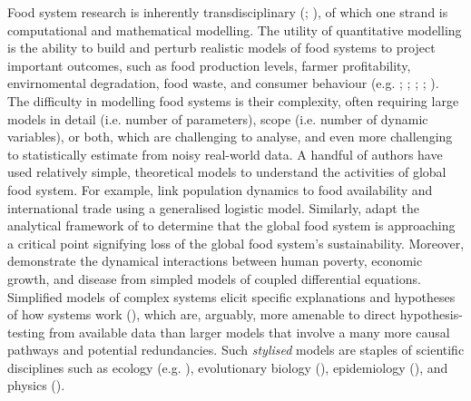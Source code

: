 \documentclass[12pt]{article}
\begin{document}
Food system research is inherently transdisciplinary (\cite{drimie2013}; \cite{hammond2012}), of which one strand is computational and mathematical modelling. The utility of quantitative modelling is the ability to build and perturb realistic models of food systems to project important outcomes, such as food production levels, farmer profitability, envirnomental degradation, food waste, and consumer behaviour (e.g. \cite{springmann2018}; \cite{marchand2016}; \cite{sampedro2020}; \cite{suweis2015}; \cite{scalco2019}). The difficulty in modelling food systems is their complexity, often requiring large models in detail (i.e. number of parameters), scope (i.e. number of dynamic variables), or both, which are challenging to analyse, and even more challenging to statistically estimate from noisy real-world data. A handful of authors have used relatively simple, theoretical models to understand the activities of global food system. For example, \textcite{suweis2015} link population dynamics to food availability and international trade using a generalised logistic model. Similarly, \textcite{tu2019} adapt the analytical framework of \textcite{gao2016} to determine that the global food system is approaching a critical point signifying loss of the global food system's sustainability. Moreover, \textcite{ngonghala2017} demonstrate the dynamical interactions between human poverty, economic growth, and disease from simpled models of coupled differential equations. Simplified models of complex systems elicit specific explanations and hypotheses of how systems work (\cite{smaldino2019}), which are, arguably, more amenable to direct hypothesis-testing from available data than larger models that involve a many more causal pathways and potential redundancies. Such \textit{stylised} models are staples of scientific disciplines such as ecology (e.g. \cite{may1973}), evolutionary biology (\cite{boyd2003}), epidemiology (\cite{kermack1927}), and physics (\cite{strogatz1994}). 

\newpage
\printbibliography
\end{document}
